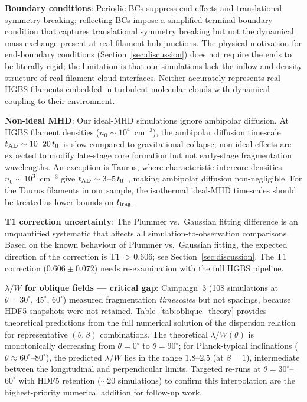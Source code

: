 \documentclass[twoside,twocolumn]{mnras}
\begin{document}
\textbf{Boundary conditions}: Periodic BCs suppress end effects and translational
symmetry breaking; reflecting BCs impose a simplified terminal boundary condition that captures translational symmetry breaking but not the dynamical mass exchange present at real filament-hub junctions. The physical motivation for end-boundary conditions (Section~\ref{sec:discussion}) does not require the ends to be literally rigid; the limitation is that our simulations lack the inflow and density structure of real filament-cloud interfaces. Neither accurately represents real HGBS filaments embedded in turbulent molecular clouds with dynamical coupling to their environment.

\textbf{Non-ideal MHD}: Our ideal-MHD simulations ignore ambipolar diffusion. At HGBS
filament densities ($n_0 \sim 10^4$~cm$^{-3}$), the ambipolar diffusion timescale
$t_{\rm AD} \sim 10$--$20\,t_{\rm ff}$ is slow compared to gravitational collapse;
non-ideal effects are expected to modify late-stage core formation but not early-stage fragmentation wavelengths. An exception is Taurus, where characteristic intercore densities $n_0 \sim 10^3$~cm$^{-3}$ give $t_{\rm AD} \sim 3$--$5\,t_{\rm ff}$ \citep{Nakamura2005, Tassis2004}, making ambipolar diffusion non-negligible. For the Taurus filaments in our sample, the isothermal ideal-MHD timescales should be treated as lower bounds on $t_{\rm frag}$.

\textbf{T1 correction uncertainty}: The Plummer vs.\ Gaussian fitting difference is an unquantified systematic that affects all simulation-to-observation comparisons. Based on the known behaviour of Plummer vs.\ Gaussian fitting, the expected direction of the correction is T1 $> 0.606$; see Section~\ref{sec:discussion}. The
T1 correction ($0.606 \pm 0.072$) needs re-examination with the full HGBS pipeline.

\textbf{$\lambda/W$ for oblique fields --- critical gap}: Campaign~3 (108 simulations at $\theta = 30^\circ$, $45^\circ$, $60^\circ$) measured fragmentation
\textit{timescales} but not spacings, because HDF5 snapshots were not retained. Table~\ref{tab:oblique_theory} provides theoretical predictions from the full numerical solution of the \citet{Nakamura1993} dispersion relation for representative $(\theta, \beta)$ combinations. The theoretical $\lambda/W(\theta)$ is monotonically decreasing from $\theta=0^\circ$ to $\theta=90^\circ$; for Planck-typical inclinations ($\theta \approx 60^\circ$--$80^\circ$), the predicted $\lambda/W$ lies in the range $1.8$--$2.5$ (at $\beta=1$), intermediate between the longitudinal and perpendicular limits. Targeted re-runs at $\theta = 30^\circ$--$60^\circ$ with HDF5 retention ($\sim$20 simulations) to confirm this interpolation are the highest-priority numerical addition for follow-up work.
\end{document}

